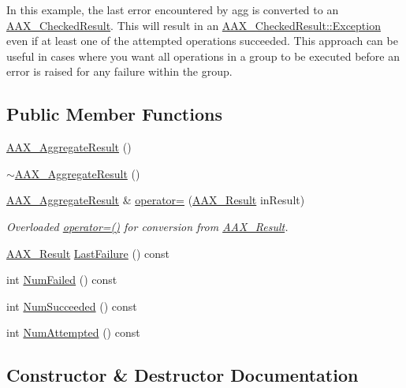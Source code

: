 In this example, the last error encountered by {\ttfamily agg} is converted to an \mbox{\hyperlink{a01601}{A\+A\+X\+\_\+\+Checked\+Result}}. This will result in an \mbox{\hyperlink{a01601_a36fd71afc6d62993c1dd96e1ca9fcc0e}{A\+A\+X\+\_\+\+Checked\+Result\+::\+Exception}} even if at least one of the attempted operations succeeded. This approach can be useful in cases where you want all operations in a group to be executed before an error is raised for any failure within the group. \subsection*{Public Member Functions}
\begin{DoxyCompactItemize}
\item 
\mbox{\hyperlink{a01605_a3e17eec78bd6568cf167a86be008e081}{A\+A\+X\+\_\+\+Aggregate\+Result}} ()
\item 
\mbox{\hyperlink{a01605_a09e9058ca4ec5df47741cef7e44cf165}{$\sim$\+A\+A\+X\+\_\+\+Aggregate\+Result}} ()
\item 
\mbox{\hyperlink{a01605}{A\+A\+X\+\_\+\+Aggregate\+Result}} \& \mbox{\hyperlink{a01605_a352314f927d81c236d8022b277853155}{operator=}} (\mbox{\hyperlink{a00392_a4d8f69a697df7f70c3a8e9b8ee130d2f}{A\+A\+X\+\_\+\+Result}} in\+Result)
\begin{DoxyCompactList}\small\item\em Overloaded {\ttfamily \mbox{\hyperlink{a01605_a352314f927d81c236d8022b277853155}{operator=()}}} for conversion from \mbox{\hyperlink{a00392_a4d8f69a697df7f70c3a8e9b8ee130d2f}{A\+A\+X\+\_\+\+Result}}. \end{DoxyCompactList}\item 
\mbox{\hyperlink{a00392_a4d8f69a697df7f70c3a8e9b8ee130d2f}{A\+A\+X\+\_\+\+Result}} \mbox{\hyperlink{a01605_a0013779e238ac59fd554aa2315658a33}{Last\+Failure}} () const
\item 
int \mbox{\hyperlink{a01605_af566e9d83e13f3df53873e112b90a6d1}{Num\+Failed}} () const
\item 
int \mbox{\hyperlink{a01605_a4b3ef5ae845c708b2f5d4e94f22fbfee}{Num\+Succeeded}} () const
\item 
int \mbox{\hyperlink{a01605_aff31a39e4489a273a28efa37e4aac781}{Num\+Attempted}} () const
\end{DoxyCompactItemize}


\subsection{Constructor \& Destructor Documentation}
\mbox{\label{a01605_a3e17eec78bd6568cf167a86be008e081}} 
